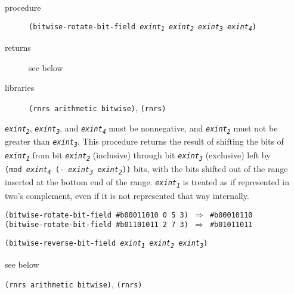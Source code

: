 \begin{description}

\label{objects_s145}\item[procedure] \texttt{(bitwise-rotate-bit-field \textit{exint\textsubscript{1}} \textit{exint\textsubscript{2}} \textit{exint\textsubscript{3}} \textit{exint\textsubscript{4}})}



\item[returns] see below


\item[libraries] \texttt{(rnrs arithmetic bitwise)}, \texttt{(rnrs)}
\end{description}

\texttt{\textit{exint\textsubscript{2}}}, \texttt{\textit{exint\textsubscript{3}}}, and \texttt{\textit{exint\textsubscript{4}}} must be nonnegative,
and \texttt{\textit{exint\textsubscript{2}}} must not be greater than \texttt{\textit{exint\textsubscript{3}}}.
This procedure returns the result of shifting the bits of
\texttt{\textit{exint\textsubscript{1}}} from bit \texttt{\textit{exint\textsubscript{2}}} (inclusive) through bit \texttt{\textit{exint\textsubscript{3}}} (exclusive)
left by \texttt{(mod \textit{exint\textsubscript{4}} (- \textit{exint\textsubscript{3}} \textit{exint\textsubscript{2}}))} bits,
with the bits shifted out of the range inserted
at the bottom end of the range.
\texttt{\textit{exint\textsubscript{1}}} is treated as if represented in two's complement, even
if it is not represented that way internally.

\begin{alltt}
(bitwise-rotate-bit-field \#{}b00011010 0 5 3) \(\Rightarrow\) \#{}b00010110
(bitwise-rotate-bit-field \#{}b01101011 2 7 3) \(\Rightarrow\) \#{}b01011011
\end{alltt}

\begin{description}

\label{objects_s146}\item[procedure] \texttt{(bitwise-reverse-bit-field \textit{exint\textsubscript{1}} \textit{exint\textsubscript{2}} \textit{exint\textsubscript{3}})}



\item[returns] see below


\item[libraries] \texttt{(rnrs arithmetic bitwise)}, \texttt{(rnrs)}
\end{description}

